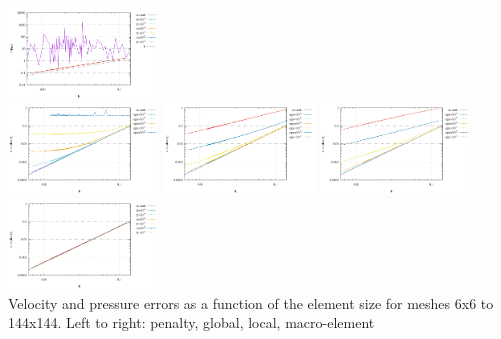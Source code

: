 \begin{center}
\includegraphics[width=4cm]{python_codes/fieldstone_115/results/buha06/errorsP_macro.pdf}\\
\includegraphics[width=4cm]{python_codes/fieldstone_115/results/buha06/divv_penalty.pdf}
\includegraphics[width=4cm]{python_codes/fieldstone_115/results/buha06/divv_global.pdf}
\includegraphics[width=4cm]{python_codes/fieldstone_115/results/buha06/divv_local.pdf}
\includegraphics[width=4cm]{python_codes/fieldstone_115/results/buha06/divv_macro.pdf}\\
{\captionfont Velocity and pressure errors as a function of the element size for meshes 6x6 to 144x144.
Left to right: penalty, global, local, macro-element}
\end{center}



